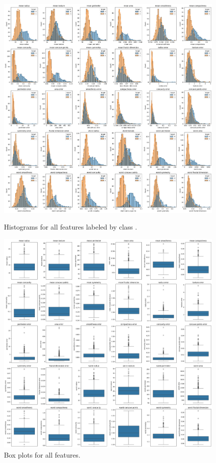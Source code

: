 \documentclass[12pt]{article}
\begin{document}
\begin{figure}[h!]
    \centering
    \begin{minipage}{0.49\textwidth}
        \centering
        \includegraphics[width=\textwidth]{assets/histograms.png}
        \caption{Histograms for all features labeled by class .}
        \label{fig:histograms_all}
    \end{minipage}
    \hfill
    \begin{minipage}{0.49\textwidth}
        \centering
        \includegraphics[width=\textwidth]{assets/boxPlots.png}
        \caption{Box plots for all features.}
        \label{fig:boxplots_all}
    \end{minipage}
    
\end{figure}
\end{document}
